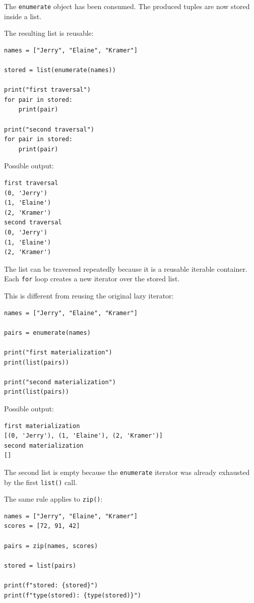 The \texttt{enumerate} object has been consumed. The produced tuples are now stored inside a list.

The resulting list is reusable:

\begin{verbatim}
names = ["Jerry", "Elaine", "Kramer"]

stored = list(enumerate(names))

print("first traversal")
for pair in stored:
    print(pair)

print("second traversal")
for pair in stored:
    print(pair)
\end{verbatim}

Possible output:

\begin{verbatim}
first traversal
(0, 'Jerry')
(1, 'Elaine')
(2, 'Kramer')
second traversal
(0, 'Jerry')
(1, 'Elaine')
(2, 'Kramer')
\end{verbatim}

The list can be traversed repeatedly because it is a reusable iterable container. Each \texttt{for} loop creates a new iterator over the stored list.

This is different from reusing the original lazy iterator:

\begin{verbatim}
names = ["Jerry", "Elaine", "Kramer"]

pairs = enumerate(names)

print("first materialization")
print(list(pairs))

print("second materialization")
print(list(pairs))
\end{verbatim}

Possible output:

\begin{verbatim}
first materialization
[(0, 'Jerry'), (1, 'Elaine'), (2, 'Kramer')]
second materialization
[]
\end{verbatim}

The second list is empty because the \texttt{enumerate} iterator was already exhausted by the first \texttt{list()} call.

The same rule applies to \texttt{zip()}:

\begin{verbatim}
names = ["Jerry", "Elaine", "Kramer"]
scores = [72, 91, 42]

pairs = zip(names, scores)

stored = list(pairs)

print(f"stored: {stored}")
print(f"type(stored): {type(stored)}")
\end{verbatim}

